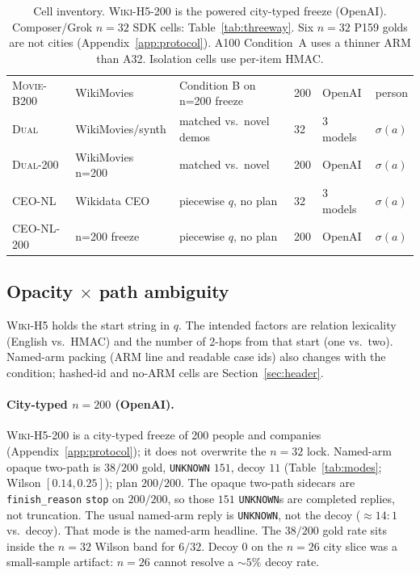 \documentclass{article}
\begin{document}
\begin{table}[htbp]
{\begin{tabular}{@{}llllll@{}}
\textsc{Movie-B200} & WikiMovies & Condition B on n=200 freeze & 200 & OpenAI & person \\
\textsc{Dual} & WikiMovies/synth & matched vs.\ novel demos & 32 & 3 models & $\sigma(a)$ \\
\textsc{Dual-200} & WikiMovies n=200 & matched vs.\ novel & 200 & OpenAI & $\sigma(a)$ \\
\textsc{CEO-NL} & Wikidata CEO & piecewise $q$, no plan & 32 & 3 models & $\sigma(a)$ \\
\textsc{CEO-NL-200} & n=200 freeze & piecewise $q$, no plan & 200 & OpenAI & $\sigma(a)$ \\
\bottomrule
\end{tabular}%
}
\caption{Cell inventory.
\textsc{Wiki-H5-200} is the powered city-typed freeze (OpenAI).
Composer/Grok $n{=}32$ SDK cells: Table~\ref{tab:threeway}.
Six $n{=}32$ P159 golds are not cities (Appendix~\ref{app:protocol}).
A100 Condition~A uses a thinner ARM than A32.
Isolation cells use per-item HMAC.}
\label{tab:inventory}
\end{table}

\subsection{Opacity \texorpdfstring{$\times$}{x} path ambiguity}
\label{sec:fact2x2}

\textsc{Wiki-H5} holds the start string in $q$. The intended factors are
relation lexicality (English vs.\ HMAC) and the number of 2-hops from that
start (one vs.\ two). Named-arm packing (ARM line and readable case ids)
also changes with the condition; hashed-id and no-ARM cells are
Section~\ref{sec:header}.

\paragraph{City-typed $n{=}200$ (OpenAI).}
\textsc{Wiki-H5-200} is a city-typed freeze of 200 people and companies
(Appendix~\ref{app:protocol}); it does not overwrite the $n{=}32$ lock.
Named-arm opaque two-path is $38/200$ gold, \texttt{UNKNOWN} $151$, decoy
$11$ (Table~\ref{tab:modes}; Wilson $[0.14,0.25]$); plan $200/200$.
The opaque two-path sidecars are \texttt{finish\_reason} \texttt{stop} on
$200/200$, so those $151$ \texttt{UNKNOWN}s are completed replies, not
truncation.
The usual named-arm reply is \texttt{UNKNOWN}, not the decoy
(${\approx}14{:}1$ vs.\ decoy). That mode is the named-arm headline.
The $38/200$ gold rate sits inside the $n{=}32$ Wilson band for $6/32$.
Decoy $0$ on the $n{=}26$ city slice was a small-sample artifact:
$n{=}26$ cannot resolve a ${\sim}5\%$ decoy rate.
\end{document}
